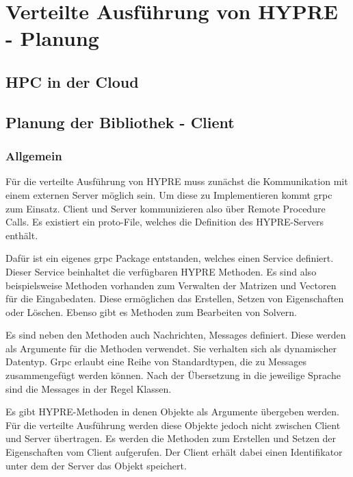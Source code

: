 \documentclass[a4paper,10pt]{article}
\numberwithin{figure}{section}
\numberwithin{table}{section}
\begin{document}
\newpage











\section{Verteilte Ausführung von HYPRE - Planung}

\subsection{HPC in der Cloud}

\subsection{Planung der Bibliothek - Client}


\subsubsection{Allgemein}

Für die verteilte Ausführung von HYPRE muss zunächst die Kommunikation mit einem externen Server möglich sein.
Um diese zu Implementieren kommt grpc zum Einsatz.
Client und Server kommunizieren also über Remote Procedure Calls.
Es existiert ein proto-File, welches die Definition des HYPRE-Servers enthält.

Dafür ist ein eigenes grpc Package entstanden, welches einen Service definiert.
Dieser Service beinhaltet die verfügbaren HYPRE Methoden.
Es sind also beispielsweise Methoden vorhanden zum Verwalten der Matrizen und Vectoren für die Eingabedaten.
Diese ermöglichen das Erstellen, Setzen von Eigenschaften oder Löschen.
Ebenso gibt es Methoden zum Bearbeiten von Solvern.

Es sind neben den Methoden auch Nachrichten, Messages definiert.
Diese werden als Argumente für die Methoden verwendet.
Sie verhalten sich als dynamischer Datentyp.
Grpc erlaubt eine Reihe von Standardtypen, die zu Messages zusammengefügt werden können.
Nach der Übersetzung in die jeweilige Sprache sind die Messages in der Regel Klassen.

Es gibt HYPRE-Methoden in denen Objekte als Argumente übergeben werden.
Für die verteilte Ausführung werden diese Objekte jedoch nicht zwischen Client und Server übertragen.
Es werden die Methoden zum Erstellen und Setzen der Eigenschaften vom Client aufgerufen.
Der Client erhält dabei einen Identifikator unter dem der Server das Objekt speichert.
\end{document}
